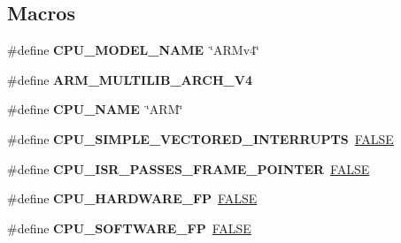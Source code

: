 \subsection*{Macros}
\begin{DoxyCompactItemize}
\item 
\mbox{\label{group__RTEMSScoreCPUARM_ga6161655f251417659ec80a3023bb0ec9}} 
\#define {\bfseries C\+P\+U\+\_\+\+M\+O\+D\+E\+L\+\_\+\+N\+A\+ME}~\char`\"{}A\+R\+Mv4\char`\"{}
\item 
\mbox{\label{group__RTEMSScoreCPUARM_ga8ff2ab7e1293cb0de879790b0b9288ae}} 
\#define {\bfseries A\+R\+M\+\_\+\+M\+U\+L\+T\+I\+L\+I\+B\+\_\+\+A\+R\+C\+H\+\_\+\+V4}
\item 
\mbox{\label{group__RTEMSScoreCPUARM_ga65a2f3e765349445fd8ad6a44d7e498a}} 
\#define {\bfseries C\+P\+U\+\_\+\+N\+A\+ME}~\char`\"{}A\+RM\char`\"{}
\item 
\mbox{\label{group__RTEMSScoreCPUARM_ga1eca01dbb1ef2873349cc4e222509f0a}} 
\#define {\bfseries C\+P\+U\+\_\+\+S\+I\+M\+P\+L\+E\+\_\+\+V\+E\+C\+T\+O\+R\+E\+D\+\_\+\+I\+N\+T\+E\+R\+R\+U\+P\+TS}~\mbox{\hyperlink{group__RTEMSScoreBaseDefs_gaa93f0eb578d23995850d61f7d61c55c1}{F\+A\+L\+SE}}
\item 
\mbox{\label{group__RTEMSScoreCPUARM_ga30c4d320f85b1383c5059da5b19b164a}} 
\#define {\bfseries C\+P\+U\+\_\+\+I\+S\+R\+\_\+\+P\+A\+S\+S\+E\+S\+\_\+\+F\+R\+A\+M\+E\+\_\+\+P\+O\+I\+N\+T\+ER}~\mbox{\hyperlink{group__RTEMSScoreBaseDefs_gaa93f0eb578d23995850d61f7d61c55c1}{F\+A\+L\+SE}}
\item 
\mbox{\label{group__RTEMSScoreCPUARM_ga112f88f13afe8bb8f1b13f1ca7e09b8d}} 
\#define {\bfseries C\+P\+U\+\_\+\+H\+A\+R\+D\+W\+A\+R\+E\+\_\+\+FP}~\mbox{\hyperlink{group__RTEMSScoreBaseDefs_gaa93f0eb578d23995850d61f7d61c55c1}{F\+A\+L\+SE}}
\item 
\mbox{\label{group__RTEMSScoreCPUARM_ga304f78c61edce38bb88e909f90a326dc}} 
\#define {\bfseries C\+P\+U\+\_\+\+S\+O\+F\+T\+W\+A\+R\+E\+\_\+\+FP}~\mbox{\hyperlink{group__RTEMSScoreBaseDefs_gaa93f0eb578d23995850d61f7d61c55c1}{F\+A\+L\+SE}}

\end{DoxyCompactItemize}
